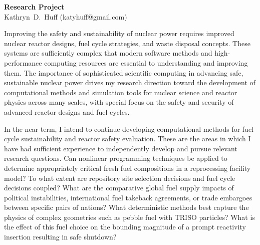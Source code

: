 \documentclass[a4paper, 10pt]{article}
\makeatletter
\newcommand{\authorname}{Kathryn~D.~Huff }
\newcommand{\authoremail}{katyhuff@gmail.com}
\newcommand{\authorsite}{katyhuff.github.com}
\makeatother
\begin{document}
\pagestyle{fancy}
\lhead{\textcolor{gray}{\it \authorname}}
\rhead{\textcolor{gray}{\thepage/\totalpages{}}}
\renewcommand{\headrulewidth}{0pt} 
\renewcommand{\footrulewidth}{0pt} 
\fancyfoot[C]{\footnotesize \textcolor{gray}{\authorsite}} 

\begin{center}
{\LARGE \bf Research Project}\\
\vspace*{0.1cm}
{\normalsize \authorname (\authoremail)}
\end{center}




Improving the safety and sustainability of nuclear power requires improved 
nuclear reactor designs, fuel cycle strategies, and waste disposal concepts.  
These systems are sufficiently complex that modern software methods and 
high-performance computing resources are essential to understanding and 
improving them. The importance of sophisticated scientific computing in 
advancing safe, sustainable nuclear power drives my research direction toward 
the development of computational methods and simulation tools for nuclear 
science and  reactor physics across many scales, with special focus on the 
safety and security of advanced reactor designs and fuel cycles.

In the near term, I intend to continue developing computational methods for fuel 
cycle sustainability and reactor safety evaluation. These are the areas in which I 
have had sufficient experience to independently develop and pursue relevant 
research questions.  Can nonlinear programming techniques be applied to 
determine appropriately critical fresh fuel compositions in a reprocessing 
facility model? To what extent are repository site selection decisions and fuel 
cycle decisions coupled? What are the comparative global fuel supply impacts of 
political instabilities, international fuel takeback agreements, or
trade embargoes between specific pairs of nations?  What deterministic methods 
best capture the physics of complex geometries such as pebble fuel with TRISO 
particles? What is the effect of this fuel choice on the bounding magnitude of a 
prompt reactivity insertion resulting in safe shutdown? 
\end{document}
